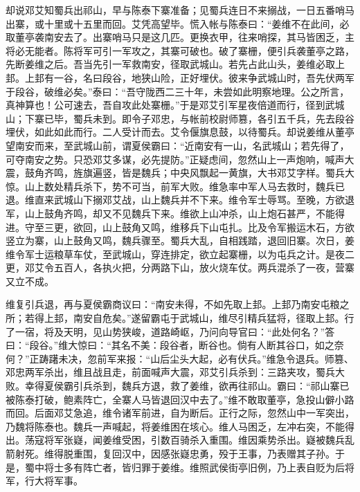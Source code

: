 却说邓艾知蜀兵出祁山，早与陈泰下寨准备；见蜀兵连日不来搦战，一日五番哨马出寨，或十里或十五里而回。艾凭高望毕。慌入帐与陈泰曰：“姜维不在此间，必取董亭袭南安去了。出寨哨马只是这几匹。更换衣甲，往来哨探，其马皆困乏，主将必无能者。陈将军可引一军攻之，其寨可破也。破了寨栅，便引兵袭董亭之路，先断姜维之后。吾当先引一军救南安，径取武城山。若先占此山头，姜维必取上邽。上邽有一谷，名曰段谷，地狭山险，正好埋伏。彼来争武城山时，吾先伏两军于段谷，破维必矣。”泰曰：“吾守陇西二三十年，未尝如此明察地理。公之所言，真神算也！公可速去，吾自攻此处寨栅。”于是邓艾引军星夜倍道而行，径到武城山；下寨已毕，蜀兵未到。即令子邓忠，与帐前校尉师篡，各引五千兵，先去段谷埋伏，如此如此而行。二人受计而去。艾令偃旗息鼓，以待蜀兵。却说姜维从董亭望南安而来，至武城山前，谓夏侯霸曰：“近南安有一山，名武城山；若先得了，可夺南安之势。只恐邓艾多谋，必先提防。”正疑虑间，忽然山上一声炮响，喊声大震，鼓角齐鸣，旌旗遍竖，皆是魏兵；中央风飘起一黄旗，大书邓艾字样。蜀兵大惊。山上数处精兵杀下，势不可当，前军大败。维急率中军人马去救时，魏兵已退。维直来武城山下搦邓艾战，山上魏兵并不下来。维令军士辱骂。至晚，方欲退军，山上鼓角齐鸣，却又不见魏兵下来。维欲上山冲杀，山上炮石甚严，不能得进。守至三更，欲回，山上鼓角又鸣，维移兵下山屯扎。比及令军搬运木石，方欲竖立为寨，山上鼓角又鸣，魏兵骤至。蜀兵大乱，自相践踏，退回旧寨。次日，姜维令军士运粮草车仗，至武城山，穿连排定，欲立起寨栅，以为屯兵之计。是夜二更，邓艾令五百人，各执火把，分两路下山，放火烧车仗。两兵混杀了一夜，营寨又立不成。

维复引兵退，再与夏侯霸商议曰：“南安未得，不如先取上邽。上邽乃南安屯粮之所；若得上邽，南安自危矣。”遂留霸屯于武城山，维尽引精兵猛将，径取上邽。行了一宿，将及天明，见山势狭峻，道路崎岖，乃问向导官曰：“此处何名？”答曰：“段谷。”维大惊曰：“其名不美：段谷者，断谷也。倘有人断其谷口，如之奈何？”正踌躇未决，忽前军来报：“山后尘头大起，必有伏兵。”维急令退兵。师篡、邓忠两军杀出，维且战且走，前面喊声大震，邓艾引兵杀到：三路夹攻，蜀兵大败。幸得夏侯霸引兵杀到，魏兵方退，救了姜维，欲再往祁山。霸曰：“祁山寨已被陈泰打破，鲍素阵亡，全寨人马皆退回汉中去了。”维不敢取董亭，急投山僻小路而回。后面邓艾急追，维令诸军前进，自为断后。正行之际，忽然山中一军突出，乃魏将陈泰也。魏兵一声喊起，将姜维困在垓心。维人马困乏，左冲右突，不能得出。荡寇将军张嶷，闻姜维受困，引数百骑杀入重围。维因乘势杀出。嶷被魏兵乱箭射死。维得脱重围，复回汉中，因感张嶷忠勇，殁于王事，乃表赠其子孙。于是，蜀中将士多有阵亡者，皆归罪于姜维。维照武侯街亭旧例，乃上表自贬为后将军，行大将军事。

